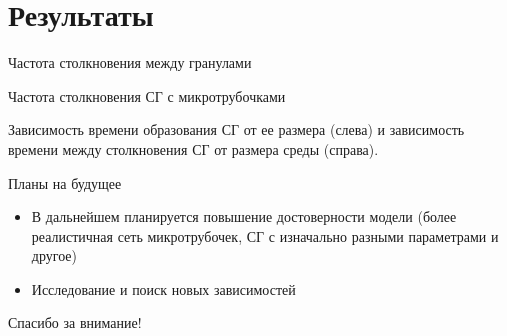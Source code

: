 \documentclass{beamer}
\begin{document}
\section{Результаты}
\begin{frame}{Частота столкновения между гранулами}
\begin{figure}
%
\end{figure}
\end{frame}

\begin{frame}{Частота столкновения СГ с микротрубочками}
\begin{figure}
%
\end{figure}
\end{frame}

\begin{frame}
\begin{figure}
%
\end{figure}
Зависимость времени образования СГ от ее размера (слева) и зависимость времени между столкновения СГ от размера среды (справа).
\end{frame}

\begin{frame}{Планы на будущее}
\begin{itemize}
\item В дальнейшем планируется повышение достоверности модели (более реалистичная сеть микротрубочек, СГ с изначально разными параметрами и другое)
\item Исследование и поиск новых зависимостей
\end{itemize}
\end{frame}

\begin{frame}
\centering\Huge
Спасибо за внимание!
\end{frame}
\end{document}
